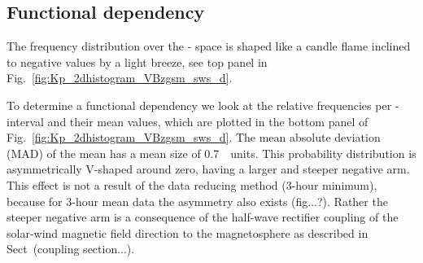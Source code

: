 \subsection{Functional dependency}
The frequency distribution over the \Kp-\vBz{} space is shaped like a candle flame inclined to negative values by a light breeze, see top panel in Fig.~\ref{fig:Kp_2dhistogram_VBzgsm_sws_d}.
\begin{figure}
\end{figure}

To determine a functional dependency we look at the relative frequencies per \vBz-interval and their mean \Kp{} values, which are plotted in the bottom panel of Fig.~\ref{fig:Kp_2dhistogram_VBzgsm_sws_d}. The mean absolute deviation (MAD) of the mean has a mean size of \SI{0.7}{\Kp~units}. This probability distribution is asymmetrically V-shaped around zero, having a larger and steeper negative arm. This effect is not a result of the data reducing method (3-hour minimum), because for 3-hour mean data the asymmetry also exists (fig...?). Rather the steeper negative arm is a consequence of the half-wave rectifier coupling of the solar-wind magnetic field direction to the magnetosphere as described in Sect~(coupling section...).\\

